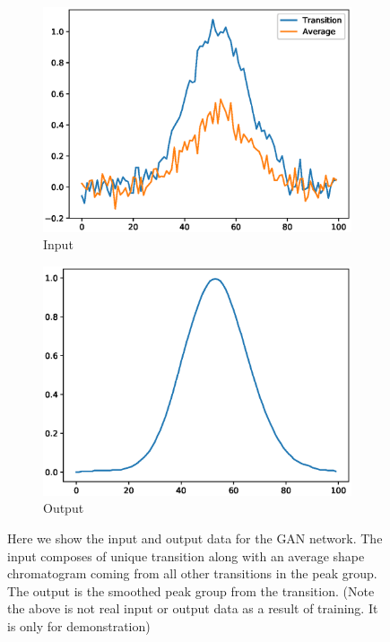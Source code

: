 \documentclass[12pt]{article}
\begin{document}
{\begin{figure}
\centering
\begin{subfigure}{.5\textwidth}
  \centering
  \includegraphics[width=1\linewidth]{input}
  \caption{Input}
  \label{fig:sub1}
\end{subfigure}%
\begin{subfigure}{.5\textwidth}
  \centering
  \includegraphics[width=1\linewidth]{output}
  \caption{Output}
  \label{fig:sub2}
\end{subfigure}
\caption{Here we show the input and output data for the GAN network. The input composes of unique transition along with an average shape chromatogram coming from all other transitions in the peak group. The output is the smoothed peak group from the transition. (Note the above is not real input or output data as a result of training. It is only for demonstration)}
\label{fig:test}
\end{figure}


}
\end{document}

